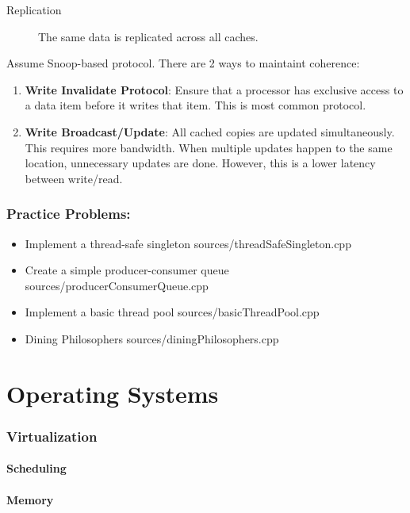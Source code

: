 \documentclass{article}
\begin{document}
      \begin{description}
        \item[Replication]
          The same data is replicated across all caches.
      \end{description}
      Assume Snoop-based protocol. There are 2 ways to maintaint coherence:
      \begin{enumerate}
        \item \textbf{Write Invalidate Protocol}: Ensure that a processor has exclusive access to a data item before it writes that item. This is most common protocol.
        \item \textbf{Write Broadcast/Update}: All cached copies are updated simultaneously. This requires more bandwidth. When multiple updates happen to the same location, unnecessary updates are done. However, this is a lower latency between write/read.
      \end{enumerate}
\section{Practice Problems:}
    \begin{itemize}
      \item Implement a thread-safe singleton
         {sources/threadSafeSingleton.cpp}
      \item Create a simple producer-consumer queue
         {sources/producerConsumerQueue.cpp}
      \item Implement a basic thread pool
         {sources/basicThreadPool.cpp}
      \item Dining Philosophers
         {sources/diningPhilosophers.cpp}
    \end{itemize}
    \part{Operating Systems}
\section{Virtualization}
    \subsection{Scheduling}
    \subsection{Memory}
\end{document}
